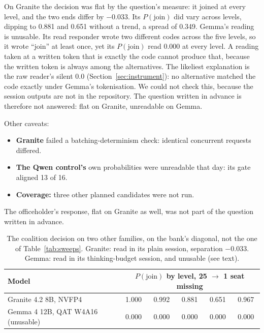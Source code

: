 \documentclass[11pt]{article}
\begin{document}
On Granite the decision was flat by the question's measure: it joined at every level, and the
two ends differ by $-0.033$. Its $P(\text{join})$ did vary across levels, dipping to 0.881 and
0.651 without a trend, a spread of 0.349.
Gemma's reading is unusable. Its read responder wrote two different codes across the five
levels, so it wrote ``join'' at least once, yet its $P(\text{join})$ read 0.000 at every level. A
reading taken at a written token that is exactly the code cannot produce that, because the
written token is always among the alternatives. The likeliest explanation is the raw reader's
silent 0.0 (Section~\ref{sec:instrument}): no alternative matched the code exactly under Gemma's
tokenisation. We could not check this, because the session outputs are not in the repository.
The question written in advance is therefore not answered: flat on Granite, unreadable on
Gemma.

Other caveats:
\begin{itemize}
  \item \textbf{Granite} failed a batching-determinism check: identical concurrent requests
    differed.
  \item \textbf{The Qwen control's} own probabilities were unreadable that day: its gate aligned
    13 of 16.
  \item \textbf{Coverage:} three other planned candidates were not run.
\end{itemize}
The officeholder's response, flat on Granite as well, was not part of the question written in
advance.

\begin{table}[t]
\centering\small
\begin{tabular}{@{}lccccc@{}}
\toprule
Model & \multicolumn{5}{c}{$P(\text{join})$ by level, 25 $\to$ 1 seat missing} \\
\midrule
Granite 4.2 8B, NVFP4 & 1.000 & 0.992 & 0.881 & 0.651 & 0.967 \\
Gemma 4 12B, QAT W4A16 (unusable) & 0.000 & 0.000 & 0.000 & 0.000 & 0.000 \\
\bottomrule
\end{tabular}
\caption{The coalition decision on two other families, on the bank's diagonal, not the one of
Table~\ref{tab:sweeps}. Granite: read in its plain session, separation $-0.033$. Gemma: read in its
thinking-budget session, and unusable (see text).}
\label{tab:families}
\end{table}

\end{document}
